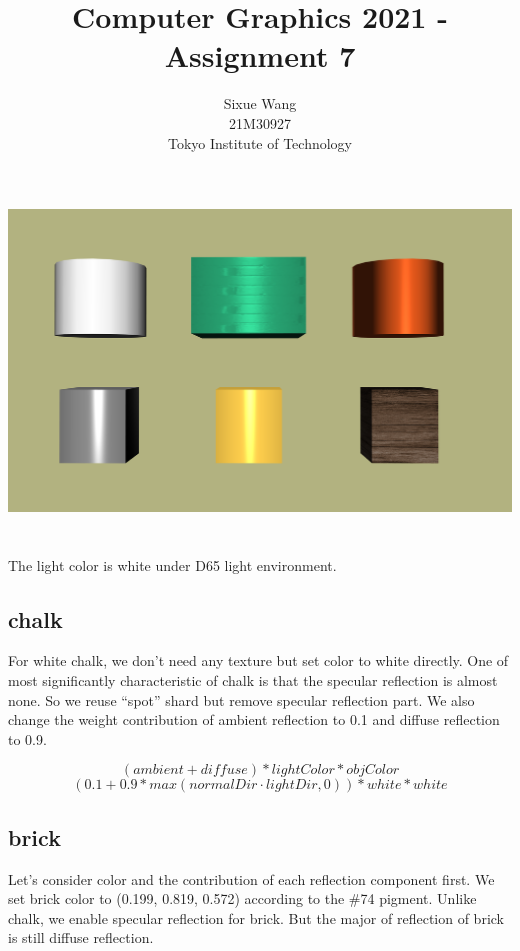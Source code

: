 \documentclass{article}
\title{Computer Graphics 2021 - Assignment 7}
\author{Sixue Wang\\21M30927\\Tokyo Institute of Technology}
\begin{document}
\maketitle


\includegraphics[width=1\textwidth]{h7.png}

\section{}

The light color is white under D65 light environment.

\subsection*{chalk}

For white chalk, we don't need any texture but set color to white directly.
One of most significantly characteristic of chalk is that the specular reflection is almost none.
So we reuse ``spot'' shard but remove specular reflection part. We also change the weight contribution of ambient reflection to 0.1 and diffuse reflection to 0.9.

\begin{equation*}
  (ambient + diffuse) * lightColor * objColor
\end{equation*}
\begin{equation*}
  (0.1 + 0.9*max(normalDir \cdot lightDir, 0)) * white * white
\end{equation*}

\subsection*{brick}

Let's consider color and the contribution of each reflection component first. We set brick color to (0.199, 0.819, 0.572) according to the \#74 pigment. Unlike chalk, we enable specular reflection for brick. But the major of reflection of brick is still diffuse reflection.
\end{document}
